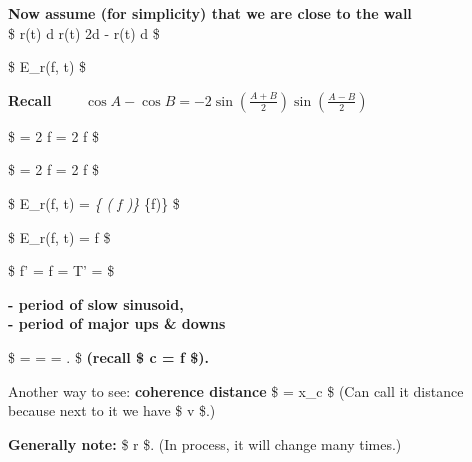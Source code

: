 \documentclass[11pt]{article}
\begin{document}
{    \textbf{Now assume (for simplicity) that we are close to the wall}\\
\$ \Rightarrow \qquad \qquad \qquad \qquad \Rightarrow r(t) \approx d
\quad \Rightarrow \quad r(t) \approx 2d - r(t) \approx d \$

\$ E\_r(f, t) \approx {}
\$

\textbf{Recall} \(\qquad
\cos A - \cos B = -2 \sin \left( \frac{A + B}{2} \right) \sin \left( \frac{A - B}{2} \right)\)

\$  = 2 \pi f
\left[ \frac{1}{2} \left[ t \left( 1 - \frac{v}{c} \right) - \frac{r_0}{c} + t \left( 1 + \frac{v}{c} \right) - \frac{2d - r_0}{c} \right] \right{]}
= 2 \pi f \$

\$  = 2 \pi f
\left[ \frac{1}{2} \left[ \cancel{t} - \frac{t \cdot v}{c} - \frac{r_0}{c} - \cancel{t} - \frac{t \cdot v}{c} + \frac{2d - r_0}{c} \right] \right{]}
= 2 \pi f \$

\$ E\_r(f, t) = 
\cdot {}\emph{\{
(  f )\}
\cdot {}}\{f)\}
\$

    \$ E\_r(f, t) = 
\cdot \sin {} \cdot {}
\pi f \$

\$ f' = f \cdot {} =  \qquad \qquad T' =
 \$

\textbf{- period of slow sinusoid,}\\
\textbf{- period of major ups \& downs}

\$ \Rightarrow {}  =  =
 \cdot {} = 
\lambda \cdot {}. \$ \textbf{(recall \$ c = f
\cdot \lambda \$).}

Another way to see: \textbf{coherence distance} \$
\approx {} = \Delta x\_c \$ (Can call it distance because
next to it we have \$ v \$.)

\textbf{Generally note:} \$  \ll r \$. (In process, it
will change many times.)

}
\end{document}
